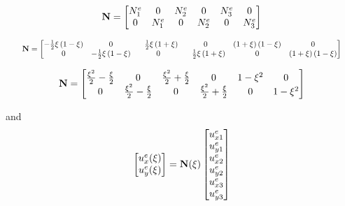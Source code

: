 \begin{equation}
    \mathbf{N} = \begin{bmatrix}
        N_1^e & 0 & N_2^e & 0 & N_3^e & 0 \\
        0 & N_1^e & 0 & N_2^e & 0 & N_3^e \\
    \end{bmatrix}
\end{equation}

\begin{equation}
    \scalebox{0.80}{
        $ \m{N} = \begin{bmatrix}
            -\frac{1}{2} \xi \left( 1 - \xi \right) &
            0 &
            \phantom{-}\frac{1}{2} \xi \left( 1 + \xi \right) &
            0 &
            \left( 1 + \xi \right) \left( 1 - \xi \right) &
            0 \\
            0 &
            -\frac{1}{2} \xi \left( 1 - \xi \right) &
            0 &
            \phantom{-}\frac{1}{2} \xi \left( 1 + \xi \right) &
            0 &
            \left( 1 + \xi \right) \left( 1 - \xi \right)
        \end{bmatrix} $
    }
\end{equation}

\begin{equation}
    \mathbf{N} = \begin{bmatrix}
        \frac{\xi^2}{2} - \frac{\xi}{2} &
        0 &
        \frac{\xi^2}{2} + \frac{\xi}{2} &
        0 &
        1 - \xi^2 &
        0 \\
        0 &
        \frac{\xi^2}{2} - \frac{\xi}{2} &
        0 &
        \frac{\xi^2}{2} + \frac{\xi}{2} &
        0 &
        1 - \xi^2 \\
    \end{bmatrix}
\end{equation}

and
\begin{equation}
    \begin{bmatrix}
        u_x^e(\xi) \\
        u_y^e(\xi) \\
    \end{bmatrix}
    = \mathbf{N}(\xi) \begin{bmatrix}
        u_{x1}^e \\
        u_{y1}^e \\
        u_{x2}^e \\
        u_{y2}^e \\
        u_{x3}^e \\
        u_{y3}^e \\
    \end{bmatrix}
\end{equation}

